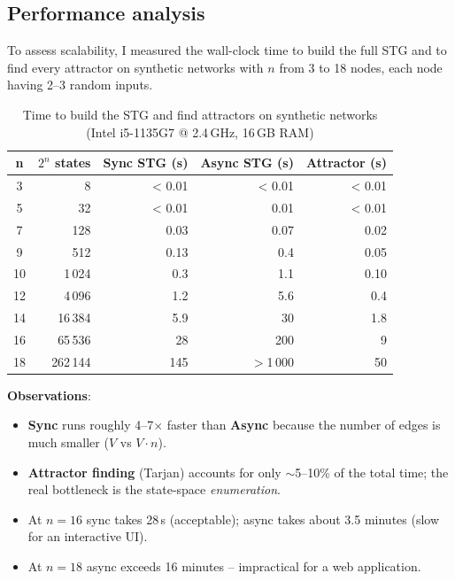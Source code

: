 \documentclass[oneside,final]{hcmut-report}
\begin{document}
\subsection{Performance analysis}\label{subsec:perf}

To assess scalability, I measured the wall-clock time to build the full STG and to find every attractor on synthetic networks with $n$ from 3 to 18 nodes, each node having 2--3 random inputs.

\begin{table}[H]
    \centering
    \renewcommand{\arraystretch}{1.3}
    \small
    \begin{tabular}{|c|r|r|r|r|}
        \hline
        \rowcolor{bklight}
        \textbf{n} & \textbf{$2^n$ states} & \textbf{Sync STG (s)} & \textbf{Async STG (s)} & \textbf{Attractor (s)} \\
        \hline
        3  & 8         & < 0.01 & < 0.01 & < 0.01 \\
        5  & 32        & < 0.01 & 0.01   & < 0.01 \\
        7  & 128       & 0.03   & 0.07   & 0.02 \\
        9  & 512       & 0.13   & 0.4    & 0.05 \\
        10 & 1\,024     & 0.3    & 1.1    & 0.10 \\
        12 & 4\,096     & 1.2    & 5.6    & 0.4 \\
        14 & 16\,384    & 5.9    & 30     & 1.8 \\
        16 & 65\,536    & 28     & 200    & 9 \\
        18 & 262\,144   & 145    & $>$1\,000  & 50 \\
        \hline
    \end{tabular}
    \caption{Time to build the STG and find attractors on synthetic networks (Intel i5-1135G7 @ 2.4\,GHz, 16\,GB RAM)}
    \label{tab:perf}
\end{table}

\textbf{Observations}:
\begin{itemize}[leftmargin=*]
    \item \textbf{Sync} runs roughly 4--7$\times$ faster than \textbf{Async} because the number of edges is much smaller ($V$ vs $V \cdot n$).
    \item \textbf{Attractor finding} (Tarjan) accounts for only $\sim$5--10\% of the total time; the real bottleneck is the state-space \textit{enumeration}.
    \item At $n = 16$ sync takes 28\,s (acceptable); async takes about 3.5 minutes (slow for an interactive UI).
    \item At $n = 18$ async exceeds 16 minutes -- impractical for a web application.
\end{itemize}
\end{document}
